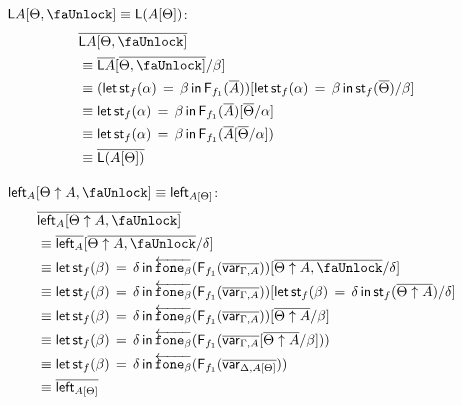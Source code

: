 \documentclass[10pt]{article}
\theoremstyle{definition}
\newcommand{\rewrite}[2]{\overleftarrow{#1}(#2)}
\newcommand\F[2]{\ensuremath{\mathsf{F}_{#1}(#2)}}
\newcommand\StI[2]{\ensuremath{\mathsf{st}_{#1}(#2)}}
\newcommand\StE[4]{\ensuremath{\mathsf{let} \, \StI{#1}{#3} \, = \, {#2} \, \mathsf{in} \, #4}}
\newcommand\FIs[2]{\ensuremath{\mathsf{F}_{#1}{(#2)}}}
\newcommand{\upstairs}[1]{\overline{#1}}
\newcommand\qvar[1]{\ensuremath{\mathsf{var}_{#1}}}
\newcommand\fone[1]{\ensuremath{\mathtt{fone}_{#1}}}
\newcommand{\lock}{\text{\faUnlock}}
\newcommand{\Ltype}[1]{\mathsf{L}{#1}}
\newcommand{\LI}[1]{\mathsf{left}_{#1}}
\begin{document}
\begin{enumerate}[style = multiline, labelwidth = 80pt]
\item[{$\Ltype{A}[\Theta, \lock] \equiv \Ltype{(A[\Theta])}$}:]
\begin{align*}
&\upstairs{\Ltype{A}[\Theta, \lock]} \\
&\equiv \upstairs{\Ltype{A}}[\upstairs{\Theta, \lock]}/\beta] \\
&\equiv (\StE{f}{\beta}{\alpha}{\F{f_1}{\upstairs{A}}})[\StE{f}{\beta}{\alpha}{\StI{f}{\upstairs{\Theta}}}/\beta] \\
&\equiv \StE{f}{\beta}{\alpha}{\F{f_1}{\upstairs{A}}[\upstairs{\Theta}/\alpha]} \\
&\equiv \StE{f}{\beta}{\alpha}{\F{f_1}{\upstairs{A}[\upstairs{\Theta}/\alpha]}} \\
&\equiv \upstairs{\Ltype{(A[\Theta])}}
\end{align*}

\item[{$\LI{A}[\Theta \uparrow A, \lock] \equiv \LI{A[\Theta]}$}:]
\begin{align*}
&\upstairs{\LI{A}[\Theta \uparrow A, \lock]} \\
&\equiv \upstairs{\LI{A}}[\upstairs{\Theta \uparrow A, \lock}/\delta] \\
&\equiv \StE{f}{\delta}{\beta}{\rewrite{\fone{\beta}}{\FIs{f_1}{\upstairs{\qvar{\Gamma, A}}}}}[\upstairs{\Theta \uparrow A, \lock}/\delta] \\
&\equiv \StE{f}{\delta}{\beta}{\rewrite{\fone{\beta}}{\FIs{f_1}{\upstairs{\qvar{\Gamma, A}}}}}[\StE{f}{\delta}{\beta}{\StI{f}{\upstairs{\Theta \uparrow A}}}/\delta] \\
&\equiv \StE{f}{\delta}{\beta}{\rewrite{\fone{\beta}}{\FIs{f_1}{\upstairs{\qvar{\Gamma, A}}}}[\upstairs{\Theta \uparrow A} / \beta]} \\
&\equiv \StE{f}{\delta}{\beta}{\rewrite{\fone{\beta}}{\FIs{f_1}{\upstairs{\qvar{\Gamma, A}}[\upstairs{\Theta \uparrow A} / \beta]}}} \\
&\equiv \StE{f}{\delta}{\beta}{\rewrite{\fone{\beta}}{\FIs{f_1}{\upstairs{\qvar{\Delta, A[\Theta]}}}}} \\
&\equiv \upstairs{\LI{A[\Theta]}}
\end{align*}


\end{enumerate}
\end{document}
